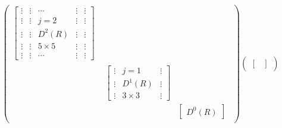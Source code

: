 \documentclass{article}
\begin{document}
	\begin{equation*}
		\begin{pmatrix}
			\begin{bmatrix}
				\vdots  & \vdots  & \cdots  & \vdots  & \vdots \\
				\vdots  & \vdots  & j=2 & \vdots  & \vdots \\
				\vdots  & \vdots  & D^{2}( R) & \vdots  & \vdots \\
				\vdots  & \vdots  & 5\times 5 & \vdots  & \vdots \\
				\vdots  & \vdots  & \cdots  & \vdots  & \vdots 
			\end{bmatrix} & \begin{matrix}
				&  &  & \\
				&  &  & \\
				&  &  & \\
				&  &  & \\
				&  &  & \\
				&  &  & 
			\end{matrix}\\
			\begin{matrix}
				&  &  &  & \\
				&  &  &  & \\
				&  &  &  & \\
				&  &  &  & 
			\end{matrix} & \begin{matrix}
				\begin{bmatrix}
					\vdots  & j=1 & \vdots \\
					\vdots  & D^{1}( R) & \vdots \\
					\vdots  & 3\times 3 & \vdots 
				\end{bmatrix} & \begin{matrix}
					\\\\
					\\\\
					\\
				\end{matrix}\\
				\begin{matrix}
					&  & 
				\end{matrix} & \begin{bmatrix}
					D^{0}( R)
				\end{bmatrix}
			\end{matrix}
		\end{pmatrix}\begin{pmatrix}
			\begin{bmatrix}

\end{bmatrix}
\end{pmatrix}
\end{equation*}
\end{document}
